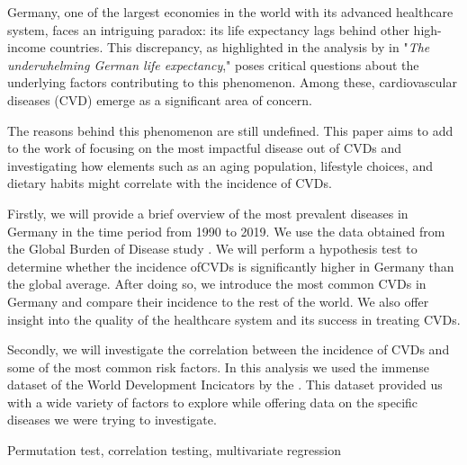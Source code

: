 
Germany, one of the largest economies in the world with its advanced healthcare 
system, faces an intriguing paradox: its life expectancy lags behind other 
high-income countries. This discrepancy, as highlighted in the analysis by 
\citet{Jasilionis2023} in "\textit{The underwhelming German life expectancy}," 
poses critical questions about the underlying factors contributing to this 
phenomenon. Among these, cardiovascular diseases (CVD) emerge as a significant area 
of concern.

The reasons behind this phenomenon are still undefined. This paper aims to add to 
the work of \citet{Jasilionis2023} focusing on the most impactful disease out of 
CVDs and investigating how elements such as an aging population, lifestyle choices, 
and dietary habits might correlate with the incidence of CVDs. 

Firstly, we will provide a brief overview of the most prevalent diseases in Germany 
in the time period from 1990 to 2019. We use the data obtained from the Global 
Burden of Disease study \citep{GBD2019}. We will perform a hypothesis test to 
determine whether the incidence ofCVDs is significantly higher in Germany than the 
global average. After doing so, we introduce the most common CVDs in Germany and 
compare their incidence to the rest of the world. We also offer insight into the 
quality of the healthcare system and its success in treating CVDs.

Secondly, we will investigate the correlation between the incidence of CVDs and 
some of the most common risk factors. In this analysis we used the immense dataset of 
the World Development Incicators by the \citet{worldbank_wdi}. This dataset provided 
us with a wide variety of factors to explore while offering data on the specific 
diseases we were trying to investigate.

Permutation test, correlation testing, multivariate regression